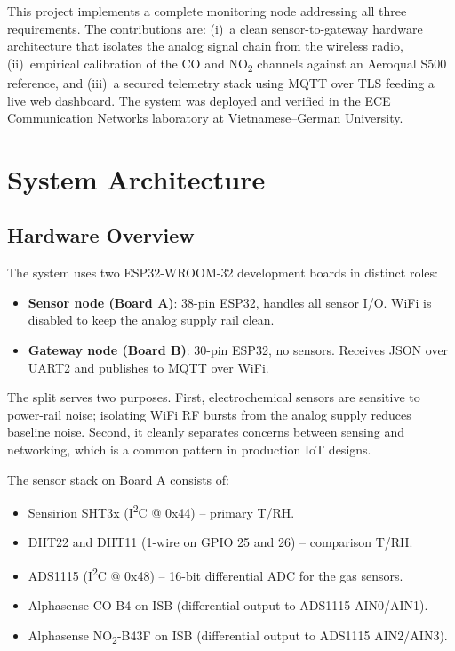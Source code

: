\documentclass[conference]{IEEEtran}
\begin{document}
This project implements a complete monitoring node addressing all three requirements. The contributions are: (i)~a clean sensor-to-gateway hardware architecture that isolates the analog signal chain from the wireless radio, (ii)~empirical calibration of the CO and NO\textsubscript{2} channels against an Aeroqual S500 reference, and (iii)~a secured telemetry stack using MQTT over TLS feeding a live web dashboard. The system was deployed and verified in the ECE Communication Networks laboratory at Vietnamese--German University.

\section{System Architecture}

\subsection{Hardware Overview}
The system uses two ESP32-WROOM-32 development boards in distinct roles:

\begin{itemize}
\item \textbf{Sensor node (Board A)}: 38-pin ESP32, handles all sensor I/O. WiFi is disabled to keep the analog supply rail clean.
\item \textbf{Gateway node (Board B)}: 30-pin ESP32, no sensors. Receives JSON over UART2 and publishes to MQTT over WiFi.
\end{itemize}

The split serves two purposes. First, electrochemical sensors are sensitive to power-rail noise; isolating WiFi RF bursts from the analog supply reduces baseline noise. Second, it cleanly separates concerns between sensing and networking, which is a common pattern in production IoT designs.

The sensor stack on Board A consists of:
\begin{itemize}
\item Sensirion SHT3x (I\textsuperscript{2}C @ 0x44) -- primary T/RH.
\item DHT22 and DHT11 (1-wire on GPIO 25 and 26) -- comparison T/RH.
\item ADS1115 (I\textsuperscript{2}C @ 0x48) -- 16-bit differential ADC for the gas sensors.
\item Alphasense CO-B4 on ISB (differential output to ADS1115 AIN0/AIN1).
\item Alphasense NO\textsubscript{2}-B43F on ISB (differential output to ADS1115 AIN2/AIN3).
\end{itemize}
\end{document}
